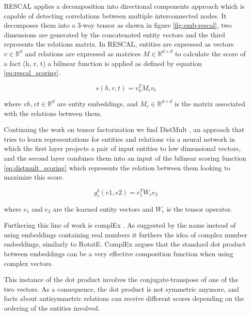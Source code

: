 RESCAL applies a decomposition into directional components approach which is capable of detecting correlations between multiple interconnected nodes. It decomposes them into a 3-way tensor as shown in figure \ref{fig:emb-rescal}, two dimensions are generated by the concatenated entity vectors and the third represents the relations matrix.
In RESCAL, entities are expressed as vectors $v \in \mathbb{R}^d$ and relations are expressed as matrices $M \in \mathbb{R}^{d \times d}$  to calculate the score of a fact (h, r, t) a bilinear function is applied as defined by equation \ref{eq:rescal_scoring}.

\begin{equation}
    \label{eq:rescal_scoring}
    s(h, r, t) = v^T_h M_r v_t
\end{equation}

where $vh, vt \in \mathbb{R}^d$ are entity embeddings, and $M_r \in \mathbb{R}^{d\times d}$ is the matrix associated with the relations between them.

Continuing the work on tensor factorization we find DistMult \cite{yang2014embedding}, an approach that tries to learn representations for entities and relations via a neural network in which the first layer projects a pair of input entities to low dimensional vectors, and the second layer combines them into an input of the bilinear scoring function \ref{eq:distmult_scoring} which represents the relation between them looking to maximize this score.

\begin{equation}
    \label{eq:distmult_scoring}
    g^b_r (e1, e2) = e_1^T W_r e_2
\end{equation}

where $e_1$ and $e_2$ are the learned entity vectors and $W_r$ is the tensor operator. 

Furthering this line of work is complEx \cite{trouillon2016complex}. As suggested by the name instead of using embeddings containing real numbers it furthers the idea of complex number embeddings, similarly to RotatE. ComplEx argues that the standard dot product between embeddings can be a very effective composition function when using complex vectors.

This instance of the dot product involves the conjugate-transpose of one of the two vectors. As a consequence, the dot product is not symmetric anymore, and facts about antisymmetric relations can receive different scores depending on the ordering of the entities involved.

